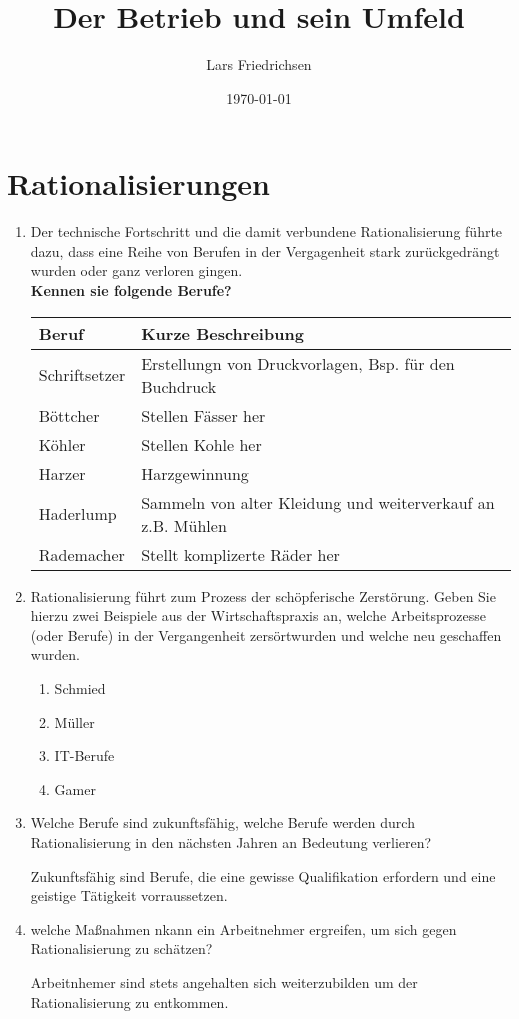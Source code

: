 \documentclass[a4paper,11pt]{scrartcl}		%
\title{Der Betrieb und sein Umfeld}
\author{Lars Friedrichsen}
\date{\today}
\begin{document}
\section{Rationalisierungen}

\begin{enumerate}
	\item Der technische Fortschritt und die damit verbundene Rationalisierung führte dazu, dass
		eine Reihe von Berufen in der Vergagenheit stark zurückgedrängt wurden oder ganz verloren gingen.\\
		\textbf{Kennen sie folgende Berufe?}\par
		\begin{tabular}{|l|l|}
			\hline
			Beruf			&	Kurze Beschreibung\\ \hline
			Schriftsetzer		&	Erstellungn von Druckvorlagen, Bsp. für den Buchdruck\\ \hline
			Böttcher		&	Stellen Fässer her\\ \hline
			Köhler			&	Stellen Kohle her\\ \hline
			Harzer			&	Harzgewinnung\\ \hline
			Haderlump		&	Sammeln von alter Kleidung und weiterverkauf an z.B. Mühlen\\ \hline
			Rademacher		&	Stellt komplizerte Räder her\\ \hline
		\end{tabular}
	\item Rationalisierung führt zum Prozess der \glqq schöpferische Zerstörung\grqq. Geben Sie hierzu zwei Beispiele aus
		der Wirtschaftspraxis an, welche Arbeitsprozesse (oder Berufe) in der Vergangenheit \glqq zersört\grqq wurden
		und welche neu geschaffen wurden.\par
		\begin{enumerate}
			\item Schmied
			\item Müller
			\item IT-Berufe
			\item Gamer
		\end{enumerate}
	\item Welche Berufe sind zukunftsfähig, welche Berufe werden durch Rationalisierung in den nächsten Jahren an
		Bedeutung verlieren?\par
		Zukunftsfähig sind Berufe, die eine gewisse Qualifikation erfordern und eine geistige Tätigkeit vorraussetzen.
	\item welche Maßnahmen nkann ein Arbeitnehmer ergreifen, um sich gegen Rationalisierung zu schätzen?\par
		Arbeitnhemer sind stets angehalten sich weiterzubilden um der Rationalisierung zu entkommen.
\end{enumerate}
\end{document}
